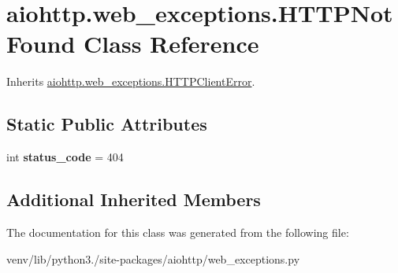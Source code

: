 \hypertarget{classaiohttp_1_1web__exceptions_1_1_h_t_t_p_not_found}{}\section{aiohttp.\+web\+\_\+exceptions.\+H\+T\+T\+P\+Not\+Found Class Reference}
\label{classaiohttp_1_1web__exceptions_1_1_h_t_t_p_not_found}


Inherits \hyperlink{classaiohttp_1_1web__exceptions_1_1_h_t_t_p_client_error}{aiohttp.\+web\+\_\+exceptions.\+H\+T\+T\+P\+Client\+Error}.

\subsection*{Static Public Attributes}
\begin{DoxyCompactItemize}
\item 
\mbox{\label{classaiohttp_1_1web__exceptions_1_1_h_t_t_p_not_found_a444f971d067c0c3400ff363f4b51a1c1}} 
int {\bfseries status\+\_\+code} = 404
\end{DoxyCompactItemize}
\subsection*{Additional Inherited Members}


The documentation for this class was generated from the following file\+:\begin{DoxyCompactItemize}
\item 
venv/lib/python3./site-\/packages/aiohttp/web\+\_\+exceptions.\+py\end{DoxyCompactItemize}
